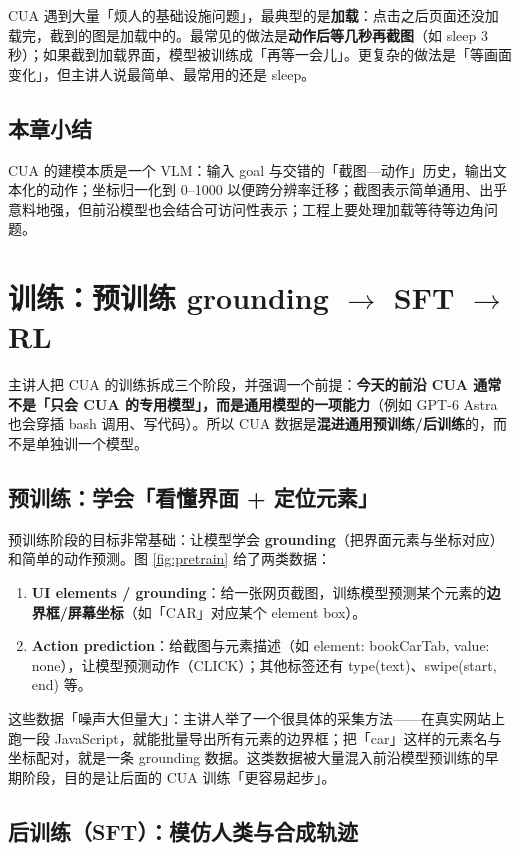 ﻿\documentclass[a4paper]{article}
\begin{document}
CUA 遇到大量「烦人的基础设施问题」，最典型的是\textbf{加载}：点击之后页面还没加载完，截到的图是加载中的。最常见的做法是\textbf{动作后等几秒再截图}（如 sleep 3 秒）；如果截到加载界面，模型被训练成「再等一会儿」。更复杂的做法是「等画面变化」，但主讲人说最简单、最常用的还是 sleep。

\subsection{本章小结}
CUA 的建模本质是一个 VLM：输入 goal 与交错的「截图—动作」历史，输出文本化的动作；坐标归一化到 0--1000 以便跨分辨率迁移；截图表示简单通用、出乎意料地强，但前沿模型也会结合可访问性表示；工程上要处理加载等待等边角问题。

\section{训练：预训练 grounding $\rightarrow$ SFT $\rightarrow$ RL}

主讲人把 CUA 的训练拆成三个阶段，并强调一个前提：\textbf{今天的前沿 CUA 通常不是「只会 CUA 的专用模型」，而是通用模型的一项能力}（例如 GPT-6 Astra 也会穿插 bash 调用、写代码）。所以 CUA 数据是\textbf{混进通用预训练/后训练}的，而不是单独训一个模型。

\subsection{预训练：学会「看懂界面 + 定位元素」}

预训练阶段的目标非常基础：让模型学会 \textbf{grounding}（把界面元素与坐标对应）和简单的动作预测。图 \ref{fig:pretrain} 给了两类数据：

\begin{enumerate}
\item \textbf{UI elements / grounding}：给一张网页截图，训练模型预测某个元素的\textbf{边界框/屏幕坐标}（如「CAR」对应某个 element box）。
\item \textbf{Action prediction}：给截图与元素描述（如 element: bookCarTab, value: none），让模型预测动作（CLICK）；其他标签还有 type(text)、swipe(start, end) 等。
\end{enumerate}

这些数据「噪声大但量大」：主讲人举了一个很具体的采集方法——在真实网站上跑一段 JavaScript，就能批量导出所有元素的边界框；把「car」这样的元素名与坐标配对，就是一条 grounding 数据。这类数据被大量混入前沿模型预训练的早期阶段，目的是让后面的 CUA 训练「更容易起步」。

\subsection{后训练（SFT）：模仿人类与合成轨迹}
\end{document}
